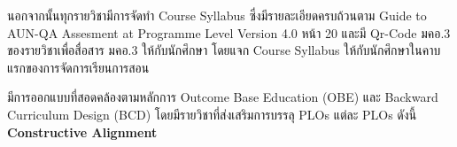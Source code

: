 นอกจากนั้นทุกรายวิชามีการจัดทำ Course Syllabus ซึ่งมีรายละเอียดครบถ้วนตาม Guide to AUN-QA Assesment at Programme Level Version 4.0 หน้า 20 และมี Qr-Code มคอ.3 ของรายวิชาเพื่อสื่อสาร มคอ.3 ให้กับนักศึกษา โดยแจก Course Syllabus ให้กับนักศึกษาในคาบแรกของการจัดการเรียนการสอน

\begin{doclist}

\end{doclist}



\printprogram{} มีการออกแบบที่สอดคล้องตามหลักการ Outcome Base Education (OBE) และ Backward Curriculum Design (BCD) โดยมีรายวิชาที่ส่งเสริมการบรรลุ PLOs แต่ละ PLOs ดังนี้\\
\textbf{Constructive Alignment}
